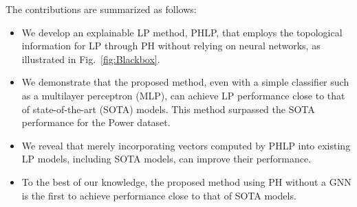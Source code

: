 The contributions are summarized as follows:
\begin{itemize}
    \item We develop an explainable LP method, PHLP, that employs the topological information for LP through PH without relying on neural networks, as illustrated in Fig.~\ref{fig:Blackbox}.
    \item We demonstrate that the proposed method, even with a simple classifier such as a multilayer perceptron (MLP), can achieve LP performance close to that of state-of-the-art (SOTA) models.
    This method surpassed the SOTA performance for the Power dataset.
    \item We reveal that merely incorporating vectors computed by PHLP into existing LP models, including SOTA models, can improve their performance.
    \item To the best of our knowledge, the proposed method using PH without a GNN is the first to achieve performance close to that of SOTA models.
\end{itemize}